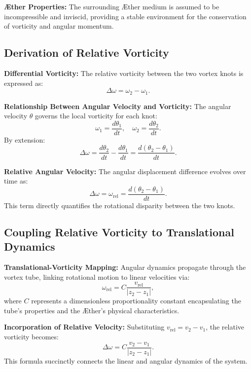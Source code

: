\documentclass[a4paper,10pt]{article}
\begin{document}
    \textbf{Æther Properties:} The surrounding Æther medium is assumed to be incompressible and inviscid, providing a stable environment for the conservation of vorticity and angular momentum.

    \subsection*{Derivation of Relative Vorticity}
    \textbf{Differential Vorticity:} The relative vorticity between the two vortex knots is expressed as:
    \begin{equation*}
        \Delta \omega = \omega_2 - \omega_1.
    \end{equation*}

    \textbf{Relationship Between Angular Velocity and Vorticity:} The angular velocity $\theta$ governs the local vorticity for each knot:
    \begin{equation*}
        \omega_1 = \frac{d\theta_1}{dt}, \quad \omega_2 = \frac{d\theta_2}{dt}.
    \end{equation*}
    By extension:
    \begin{equation*}
        \Delta \omega = \frac{d\theta_2}{dt} - \frac{d\theta_1}{dt} = \frac{d(\theta_2 - \theta_1)}{dt}.
    \end{equation*}

    \textbf{Relative Angular Velocity:} The angular displacement difference evolves over time as:
    \begin{equation*}
        \Delta \omega = \omega_\text{rel} = \frac{d(\theta_2 - \theta_1)}{dt}.
    \end{equation*}
    This term directly quantifies the rotational disparity between the two knots.

    \subsection*{Coupling Relative Vorticity to Translational Dynamics}
    \textbf{Translational-Vorticity Mapping:} Angular dynamics propagate through the vortex tube, linking rotational motion to linear velocities via:
    \begin{equation*}
        \omega_\text{rel} = C \frac{v_\text{rel}}{|z_2 - z_1|},
    \end{equation*}
    where $C$ represents a dimensionless proportionality constant encapsulating the tube's properties and the Æther's physical characteristics.

    \textbf{Incorporation of Relative Velocity:} Substituting $v_\text{rel} = v_2 - v_1$, the relative vorticity becomes:
    \begin{equation*}
        \Delta \omega = C \frac{v_2 - v_1}{|z_2 - z_1|}.
    \end{equation*}
    This formula succinctly connects the linear and angular dynamics of the system.
\end{document}
